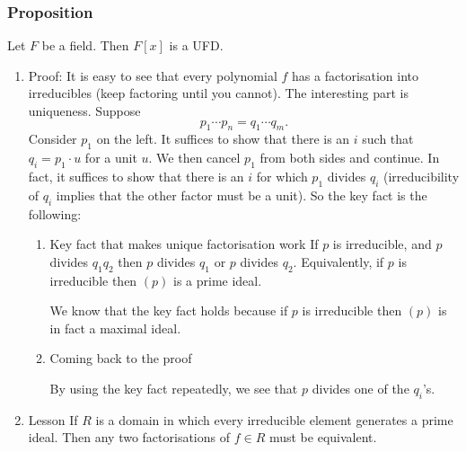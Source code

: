 \documentclass[11pt]{article}
\begin{document}
\subsubsection{Proposition}
\label{sec:org9c97099}
Let \(F\) be a field.  Then \(F[x]\) is a UFD.
\begin{enumerate}
\item Proof:
\label{sec:orgf7b69b8}
It is easy to see that every polynomial \(f\) has a factorisation into irreducibles (keep factoring until you cannot).  The interesting part is uniqueness.
Suppose
\[ p_1 \cdots p_{n} = q_{1} \cdots q_{m}.\]
Consider \(p_{1}\) on the left.
It suffices to show that there is an \(i\) such that \(q_{i} = p_{1} \cdot u\) for a unit \(u\).
We then cancel \(p_1\) from both sides and continue.
In fact, it suffices to show that there is an \(i\) for which \(p_{1}\) divides \(q_i\) (irreducibility of \(q_i\) implies that the other factor must be a unit).
So the key fact is the following:
\begin{enumerate}
\item Key fact that makes unique factorisation work
\label{sec:org94597ee}
If \(p\) is irreducible, and \(p\) divides \(q_1q_2\) then \(p\) divides \(q_1\) or \(p\) divides \(q_2\).
Equivalently, if \(p\) is irreducible then \((p)\) is a prime ideal.

We know that the key fact holds because if \(p\) is irreducible then \((p)\) is in fact a maximal ideal.
\item Coming back to the proof
\label{sec:org43c9f9c}

By using the key fact repeatedly, we see that \(p\) divides one of the \(q_{i}\)'s.
\end{enumerate}
\item Lesson
\label{sec:org412d808}
If \(R\) is a domain in which every irreducible element generates a prime ideal.
Then any two factorisations of \(f \in R\) must be equivalent.
\end{enumerate}
\end{document}
